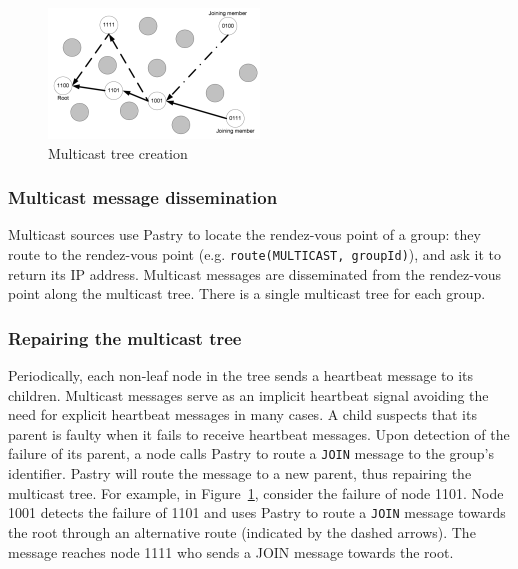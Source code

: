 \documentclass[a4paper,12pt]{article}
\begin{document}
\begin{figure}[t!]
  \centering
  \includegraphics[width=0.5\textwidth]{img/scribe}
  \caption{\label{fig:scribe} Multicast tree creation}
\end{figure}

\subsubsection{Multicast message dissemination}

Multicast sources use Pastry to locate the rendez-vous point of a group: they route to the rendez-vous point (e.g. \texttt{route(MULTICAST, groupId)}), and ask it to return its IP address.
Multicast messages are disseminated from the rendez-vous point along the multicast tree. There is a single multicast tree for each group.

\subsubsection{Repairing the multicast tree}

Periodically, each non-leaf node in the tree sends a heartbeat message to its children. Multicast messages serve as an implicit heartbeat signal avoiding the need for explicit heartbeat messages in many cases. A child suspects that its parent is faulty when it fails to receive heartbeat messages. Upon detection of the failure of its parent, a node calls Pastry to route a \texttt{JOIN} message to the group’s identifier. Pastry will route the message to a new parent, thus repairing the multicast tree.
For example, in Figure~\ref{fig:scribe}, consider the failure of node 1101. Node 1001 detects the failure of 1101 and uses Pastry to route a \texttt{JOIN} message towards the root through an alternative route (indicated by the dashed arrows). The message reaches node 1111 who sends a JOIN message towards the root.
\end{document}
